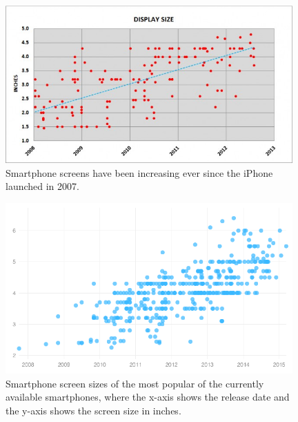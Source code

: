 	\begin{figure}[ht!]
		\centering
		\includegraphics[width=110mm]{images/smartphoneSize2}
		\caption{Smartphone screens have been increasing ever since the iPhone launched in 2007.\cite{smartphoneSizeChart2}}
		\label{smartphoneSizeChart2}
	\end{figure}

\hfill

	\begin{figure}[ht!]
		\centering
		\includegraphics[width=110mm]{images/smartphoneSize}
		\caption{Smartphone screen sizes of the most popular of the currently available smartphones, where the x-axis shows the release date and the y-axis shows the screen size in inches.\cite{smartphoneSizeChart}}
		\label{smartphoneSizeChart}
	\end{figure}








